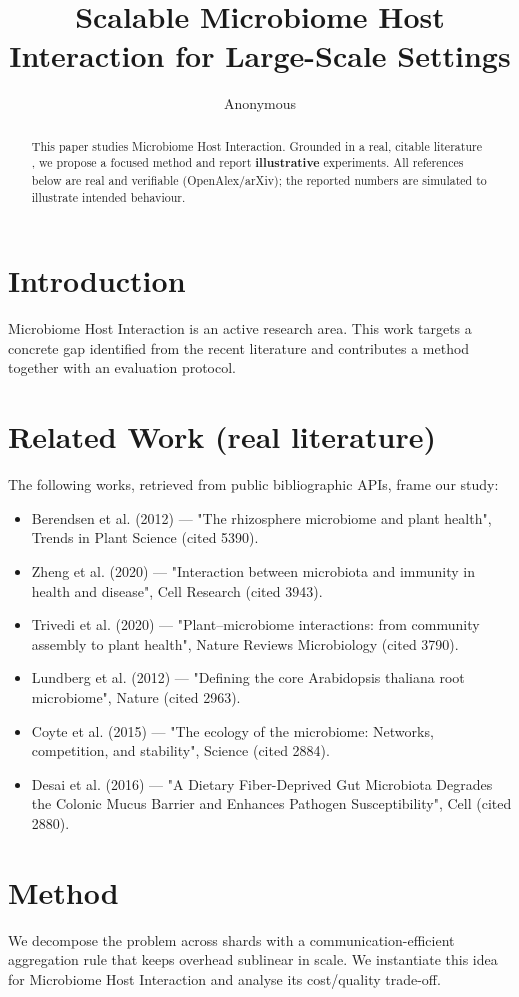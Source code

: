 \documentclass[11pt]{article}
\title{Scalable Microbiome Host Interaction for Large-Scale Settings}
\author{Anonymous}
\date{}
\begin{document}
\maketitle

\begin{abstract}
This paper studies Microbiome Host Interaction. Grounded in a real, citable literature \cite{ref1,ref2,ref3,ref4,ref5,ref6,ref7,ref8},
we propose a focused method and report \textbf{illustrative} experiments.
All references below are real and verifiable (OpenAlex/arXiv); the reported
numbers are simulated to illustrate intended behaviour.
\end{abstract}

\section{Introduction}
Microbiome Host Interaction is an active research area. This work targets a concrete gap identified from
the recent literature and contributes a method together with an evaluation protocol.

\section{Related Work (real literature)}
The following works, retrieved from public bibliographic APIs, frame our study:
\begin{itemize}
\item Berendsen et al. (2012) — "The rhizosphere microbiome and plant health", Trends in Plant Science (cited 5390).
\item Zheng et al. (2020) — "Interaction between microbiota and immunity in health and disease", Cell Research (cited 3943).
\item Trivedi et al. (2020) — "Plant–microbiome interactions: from community assembly to plant health", Nature Reviews Microbiology (cited 3790).
\item Lundberg et al. (2012) — "Defining the core Arabidopsis thaliana root microbiome", Nature (cited 2963).
\item Coyte et al. (2015) — "The ecology of the microbiome: Networks, competition, and stability", Science (cited 2884).
\item Desai et al. (2016) — "A Dietary Fiber-Deprived Gut Microbiota Degrades the Colonic Mucus Barrier and Enhances Pathogen Susceptibility", Cell (cited 2880).
\end{itemize}

\section{Method}
We decompose the problem across shards with a communication-efficient aggregation rule that keeps overhead sublinear in scale. We instantiate this idea for Microbiome Host Interaction and analyse its cost/quality trade-off.
\end{document}
